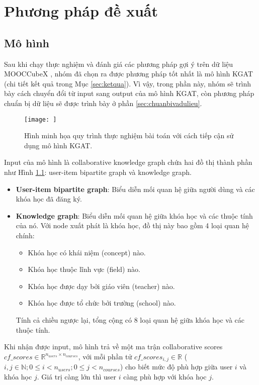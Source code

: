 \section{Phương pháp đề xuất}
\subsection{Mô hình}
Sau khi chạy thực nghiệm và đánh giá các phương pháp gợi ý trên dữ liệu MOOCCubeX \cite{mooccubex}, nhóm đã chọn ra được phương pháp tốt nhất là mô hình KGAT (chi tiết kết quả trong Mục \ref{sec:ketqua}). Vì vậy, trong phần này, nhóm sẽ trình bày cách chuyển đổi từ input sang output của mô hình KGAT, còn phương pháp chuẩn bị dữ liệu sẽ được trình bày ở phần \ref{sec:chuanbivadulieu}.

\begin{figure}[ht]
    \centering
    \texttt{[image: ]}
    \caption{Hình minh họa quy trình thực nghiệm bài toán với cách tiếp cận sử dụng mô hình KGAT.}
    \label{fig:hinh4_1}
\end{figure}

Input của mô hình là collaborative knowledge graph chứa hai đồ thị thành phần như Hình \ref{}: user-item bipartite graph và knowledge graph. 
\begin{itemize}
    \item \textbf{User-item bipartite graph}: Biểu diễn mối quan hệ giữa người dùng và các khóa học đã đăng ký. 
    \item \textbf{Knowledge graph}: Biểu diễn mối quan hệ giữa khóa học và các thuộc tính của nó. Với node xuất phát là khóa học, đồ thị này bao gồm 4 loại quan hệ chính:
    \begin{itemize}
        \item Khóa học có khái niệm (concept) nào.
        \item Khóa học thuộc lĩnh vực (field) nào.
        \item Khóa học được dạy bởi giáo viên (teacher) nào.
        \item Khóa học được tổ chức bởi trường (school) nào.
    \end{itemize}
    Tính cả chiều ngược lại, tổng cộng có 8 loại quan hệ giữa khóa học và các thuộc tính.
\end{itemize}

Khi nhận được input, mô hình trả về một ma trận collaborative scores $cf\_scores \in \mathbb{R}^{n_{users} \times n_{courses}}$, với mỗi phần tử $cf\_scores_{i,j} \in \mathbb{R}$ ($i,j \in \mathbb{N}; 0 \leq i < n_{users}; 0 \leq j < n_{courses}$) cho biết mức độ phù hợp giữa user $i$ và khóa học $j$. Giá trị càng lớn thì user $i$ càng phù hợp với khóa học $j$.

